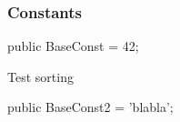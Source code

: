 \documentclass{report}
\newif\ifpdf
\begin{document}
\subsubsection*{\large{\textbf{Constants}}\normalsize\hspace{1ex}\hfill}
\begin{list}{}{
\setlength{\itemindent}{0cm}
\setlength{\listparindent}{0cm}
\setlength{\leftmargin}{\evensidemargin}
\addtolength{\leftmargin}{\tmplength}
\settowidth{\labelsep}{X}
\addtolength{\leftmargin}{\labelsep}
\setlength{\labelwidth}{\tmplength}
}
\label{ok_inherited_members.TBase-BaseConst}
\item[\textbf{BaseConst}\hfill]
\ifpdf
\begin{flushleft}
\fi
\begin{ttfamily}
public BaseConst = 42;\end{ttfamily}

\ifpdf
\end{flushleft}
\fi


\par Test sorting\label{ok_inherited_members.TBase-BaseConst2}
\item[\textbf{BaseConst2}\hfill]
\ifpdf
\begin{flushleft}
\fi
\begin{ttfamily}
public BaseConst2 = 'blabla';\end{ttfamily}

\ifpdf
\end{flushleft}
\fi


\par  \end{list}
\end{document}
